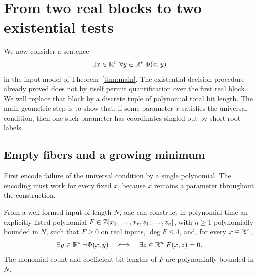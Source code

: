 \section{From two real blocks to two existential tests}
\label{sec:two-blocks}

We now consider a sentence
\[
 \exists x\in\mathbb R^r\ \forall y\in\mathbb R^s\;\Phi(x,y)
\]
in the input model of Theorem~\ref{thm:main}.  The existential decision
procedure already proved does not by itself permit quantification over
the first real block.  We will replace that block by a discrete tuple
of polynomial total bit length.  The main geometric step is to show that, if
some parameter $x$ satisfies the universal condition, then one such
parameter has coordinates singled out by short root labels.

\subsection{Empty fibers and a growing minimum}

First encode failure of the universal condition by a single polynomial.
The encoding must work for every fixed $x$, because $x$ remains a
parameter throughout the construction.

\begin{lemma}\label{lem:quartic-fibers}
From a well-formed input of length $N$, one can construct in polynomial
time an explicitly listed polynomial
$F\in\mathbb Z[x_1,\ldots,x_r,z_1,\ldots,z_n]$, with $n\ge1$ polynomially
bounded in $N$, such that $F\ge0$ on real inputs, $\deg F\le4$, and,
for every $x\in\mathbb R^r$,
\begin{equation}\label{eq:fiber-encoding}
 \exists y\in\mathbb R^s\;\neg\Phi(x,y)
 \quad\Longleftrightarrow\quad
 \exists z\in\mathbb R^n\;F(x,z)=0.
\end{equation}
The monomial count and coefficient bit lengths of $F$ are polynomially
bounded in $N$.
\end{lemma}

